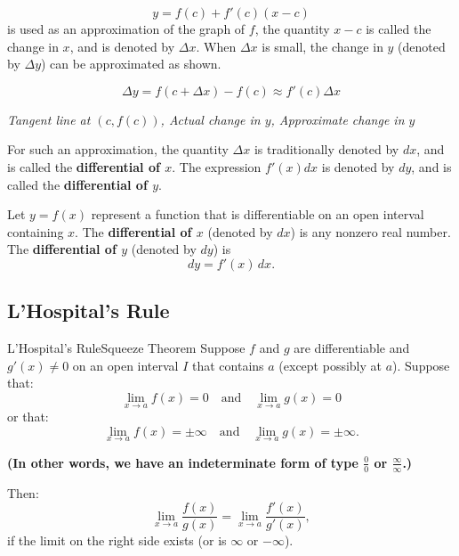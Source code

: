 \documentclass[12pt]{article}
\theoremstyle{beautifulthm}
\begin{document}

\[
y = f(c) + f'(c)(x - c)
\]
is used as an approximation of the graph of \(f\), the quantity \(x - c\) is called the change in \(x\), and is denoted by \(\Delta x\). When \(\Delta x\) is small, the change in \(y\) (denoted by \(\Delta y\)) can be approximated as shown.

\[
\Delta y = f(c + \Delta x) - f(c) \approx f'(c)\Delta x
\]

\textit{Tangent line at \((c,f(c))\), Actual change in \(y\), Approximate change in \(y\)}

For such an approximation, the quantity \(\Delta x\) is traditionally denoted by \(dx\), and is called the \textbf{differential of \(x\)}. The expression \(f'(x)dx\) is denoted by \(dy\), and is called the \textbf{differential of \(y\)}.


\begin{Definition}{}{}
Let \( y = f(x) \) represent a function that is differentiable on an open interval containing \( x \). The \textbf{differential of \( x \)} (denoted by \( dx \)) is any nonzero real number. The \textbf{differential of \( y \)} (denoted by \( dy \)) is
\[
dy = f'(x) \, dx.
\]
\end{Definition}
\newpage

\subsection{L’Hospital’s Rule}
\begin{mytheorem}{L’Hospital’s Rule}{Squeeze Theorem}
Suppose \( f \) and \( g \) are differentiable and \( g'(x) \neq 0 \) on an open interval \( I \) that contains \( a \) (except possibly at \( a \)). Suppose that:
\[
\lim_{x \to a} f(x) = 0 \quad \text{and} \quad \lim_{x \to a} g(x) = 0
\]
or that:
\[
\lim_{x \to a} f(x) = \pm \infty \quad \text{and} \quad \lim_{x \to a} g(x) = \pm \infty.
\]

\textbf{(In other words, we have an indeterminate form of type \( \frac{0}{0} \) or \( \frac{\infty}{\infty} \).)}

Then:
\[
\lim_{x \to a} \frac{f(x)}{g(x)} = \lim_{x \to a} \frac{f'(x)}{g'(x)},
\]
if the limit on the right side exists (or is \( \infty \) or \( -\infty \)).

\end{mytheorem}
\end{document}
